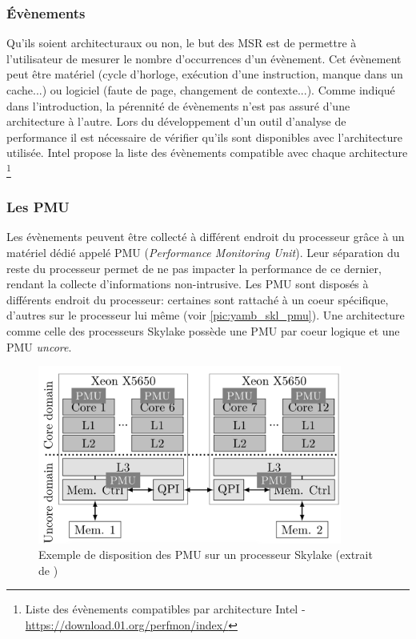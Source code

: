     
    \subsubsection{Évènements}
    
        Qu'ils soient architecturaux ou non, le but des MSR est de permettre à l'utilisateur de mesurer le nombre d'occurrences d'un évènement. Cet évènement peut être matériel (cycle d'horloge, exécution d'une instruction, manque dans un cache...) ou logiciel (faute de page, changement de contexte...). Comme indiqué dans l'introduction, la pérennité de évènements n'est pas assuré d'une architecture à l'autre. Lors du développement d'un outil d'analyse de performance il est nécessaire de vérifier qu'ils sont disponibles avec l'architecture utilisée. Intel propose la liste des évènements compatible avec chaque architecture \footnote{Liste des évènements compatibles par architecture Intel - \url{https://download.01.org/perfmon/index/}}
            
        
    
    \subsubsection{Les PMU}
    
        Les évènements peuvent être collecté à différent endroit du processeur grâce à un matériel dédié appelé PMU (\textit{Performance Monitoring Unit}). Leur séparation du reste du processeur permet de ne pas impacter la performance de ce dernier, rendant la collecte d'informations non-intrusive. Les PMU sont disposés à différents endroit du processeur: certaines sont rattaché à un coeur spécifique, d'autres sur le processeur lui même (voir \autoref{pic:yamb_skl_pmu}).  Une architecture comme celle des processeurs Skylake possède une PMU par coeur logique et une PMU \textit{uncore}. 
        
        \begin{figure}[h!]
        \center
        \includegraphics[width=10cm]{images/yamb_skl_pmu.png}
        \caption{\label{pic:yamb_skl_pmu}Exemple de disposition des PMU sur un processeur Skylake (extrait de \cite{Selva2017})}
        \end{figure}
        

